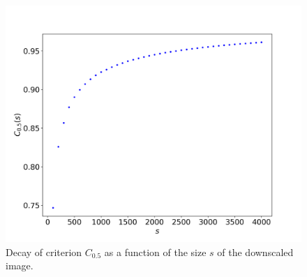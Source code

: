\documentclass[reprint,amsmath,amssymb,aps,pre,showkeys,showpacs]{revtex4-1}
\begin{document}
\begin{figure}[ht]
  \centering
  \includegraphics[width=0.9\linewidth]{images/plot-criterion.png}
  \caption[]{Decay of criterion $C_{0.5}$ as a function of the size $s$ of
    the downscaled image.}
  \label{fig:crit-plot}
\end{figure}
\end{document}
